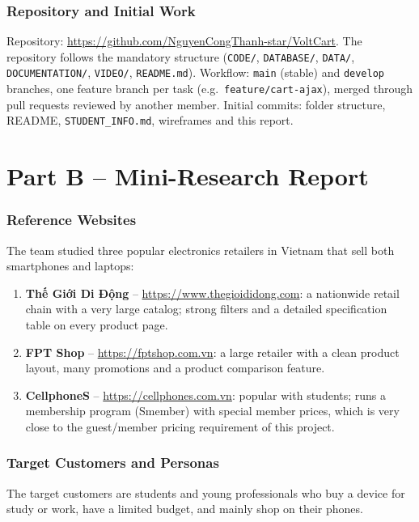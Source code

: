\documentclass[12pt,a4paper]{article}
\newcommand{\RepoURL}{\url{https://github.com/NguyenCongThanh-star/VoltCart}}
\begin{document}
\section{Repository and Initial Work}

Repository: \RepoURL. The repository follows the mandatory structure
(\texttt{CODE/}, \texttt{DATABASE/}, \texttt{DATA/}, \texttt{DOCUMENTATION/}, \texttt{VIDEO/},
\texttt{README.md}). Workflow: \texttt{main} (stable) and \texttt{develop} branches,
one feature branch per task (e.g.\ \texttt{feature/cart-ajax}), merged through pull requests
reviewed by another member. Initial commits: folder structure, README, \texttt{STUDENT\_INFO.md},
wireframes and this report.

\newpage
\part*{\large Part B -- Mini-Research Report}

\section{Reference Websites}

The team studied three popular electronics retailers in Vietnam that sell both smartphones and laptops:

\begin{enumerate}
  \item \textbf{Thế Giới Di Động} -- \url{https://www.thegioididong.com}:
        a nationwide retail chain with a very large catalog; strong filters and a detailed
        specification table on every product page.
  \item \textbf{FPT Shop} -- \url{https://fptshop.com.vn}:
        a large retailer with a clean product layout, many promotions and a product comparison feature.
  \item \textbf{CellphoneS} -- \url{https://cellphones.com.vn}:
        popular with students; runs a membership program (Smember) with special member prices,
        which is very close to the guest/member pricing requirement of this project.
\end{enumerate}

\section{Target Customers and Personas}

The target customers are students and young professionals who buy a device for study or work,
have a limited budget, and mainly shop on their phones.
\end{document}
